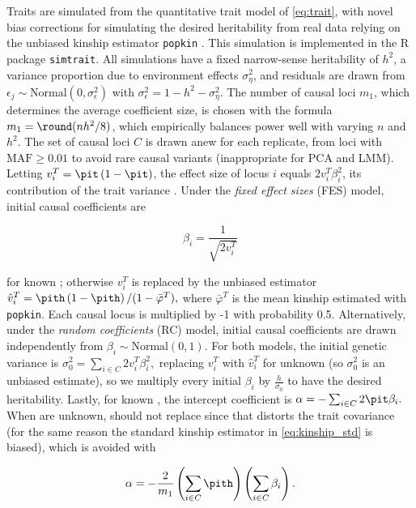 \documentclass[11pt]{article}
\begin{document}
\begin{linenumbers}
Traits are simulated from the quantitative trait model of \cref{eq:trait}, with novel bias corrections for simulating the desired heritability from real data relying on the unbiased kinship estimator \texttt{popkin} \citep{ochoa_estimating_2021}.
This simulation is implemented in the R package \texttt{simtrait}.
All simulations have a fixed narrow-sense heritability of $h^2$, a variance proportion due to environment effects $\sigma^2_\eta$, and residuals are drawn from $\epsilon_j \sim \text{Normal}(0, \sigma^2_\epsilon )$ with $\sigma^2_\epsilon = 1 - h^2 - \sigma^2_\eta$.
The number of causal loci $m_1$, which determines the average coefficient size, is chosen with the formula $m_1 = \round( n h^2 / 8 )$, which empirically balances power well with varying $n$ and $h^2$.
The set of causal loci $C$ is drawn anew for each replicate, from loci with $\text{MAF} \ge 0.01$ to avoid rare causal variants (inappropriate for PCA and LMM).
Letting $v_i^T = \pit \left( 1 - \pit \right)$, the effect size of locus $i$ equals $2 v_i^T \beta_i^2$, its contribution of the trait variance \citep{park_estimation_2010}.
Under the \textit{fixed effect sizes} (FES) model, initial causal coefficients are
\begin{linenomath*}
$$
\beta_i = \frac{1}{ \sqrt{ 2 v_i^T } }
$$
\end{linenomath*}
for known \pit; otherwise $v_i^T$ is replaced by the unbiased estimator \citep{ochoa_estimating_2021}
$
\hat{v}_i^T
=
\pith \left( 1 - \pith \right) / ( 1 - \bar{\varphi}^T )
,
$
where $\bar{\varphi}^T$ is the mean kinship estimated with \texttt{popkin}.
Each causal locus is multiplied by -1 with probability 0.5.
Alternatively, under the \textit{random coefficients} (RC) model, initial causal coefficients are drawn independently from $\beta_i \sim \text{Normal}( 0, 1 )$.
For both models, the initial genetic variance is
$
\sigma^2_0
=
\sum_{i \in C} 2 v_i^T \beta_i^2 ,
$
replacing $v_i^T$ with $\hat{v}_i^T$ for unknown \pit (so $\sigma^2_0$ is an unbiased estimate), so we multiply every initial $\beta_i$ by $\frac{h}{ \sigma_0 }$ to have the desired heritability.
Lastly, for known \pit, the intercept coefficient is
$
\alpha = - \sum_{i \in C} 2 \pit \beta_i.
$
When \pit are unknown, \pith should not replace \pit since that distorts the trait covariance (for the same reason the standard kinship estimator in \cref{eq:kinship_std} is biased), which is avoided with
\begin{linenomath*}
$$
\alpha = - \frac{2}{m_1} \left( \sum_{i \in C} \pith \right) \left(\sum_{i \in C} \beta_i \right).
$$
\end{linenomath*}


\end{linenumbers}
\end{document}

